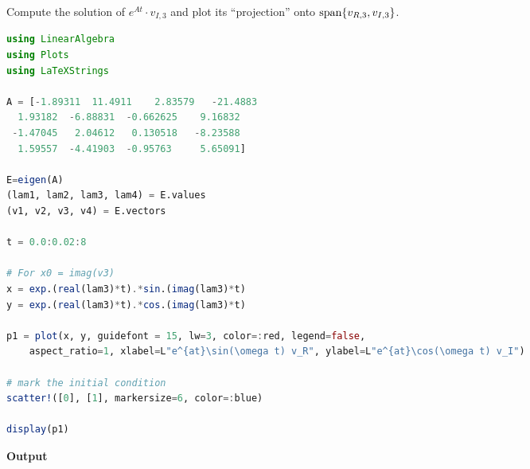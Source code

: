 \bigskip
Compute the solution of $e^{At} \cdot v_{I,3}$ and plot its ``projection'' onto $\mathrm{span} \{ v_{R,3}, v_{I,3} \}$.
\begin{lstlisting}[language=Julia,style=mystyle]
using LinearAlgebra
using Plots
using LaTeXStrings

A = [-1.89311  11.4911    2.83579   -21.4883
  1.93182  -6.88831  -0.662625    9.16832
 -1.47045   2.04612   0.130518   -8.23588
  1.59557  -4.41903  -0.95763     5.65091]

E=eigen(A)
(lam1, lam2, lam3, lam4) = E.values
(v1, v2, v3, v4) = E.vectors

t = 0.0:0.02:8

# For x0 = imag(v3)
x = exp.(real(lam3)*t).*sin.(imag(lam3)*t)
y = exp.(real(lam3)*t).*cos.(imag(lam3)*t)

p1 = plot(x, y, guidefont = 15, lw=3, color=:red, legend=false, 
    aspect_ratio=1, xlabel=L"e^{at}\sin(\omega t) v_R", ylabel=L"e^{at}\cos(\omega t) v_I")

# mark the initial condition
scatter!([0], [1], markersize=6, color=:blue)

display(p1)
\end{lstlisting}
\textbf{Output} 
